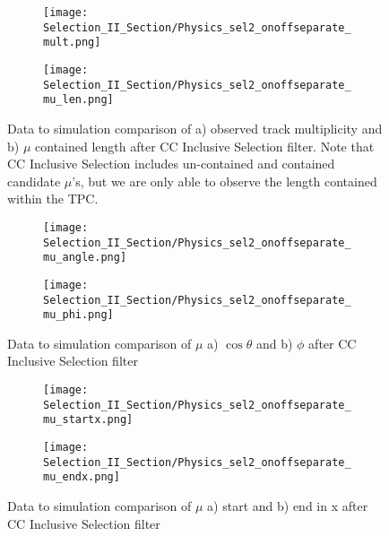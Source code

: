 \begin{figure}[h!]
\centering
  \begin{subfigure}[t]{0.3\textwidth}
    \centering
\texttt{[image: Selection\_II\_Section/Physics\_sel2\_onoffseparate\_mult.png]}
    \caption{ }
  \end{subfigure} 
  \hspace{30 mm}
  \begin{subfigure}[t]{0.3\textwidth}
    \centering
\texttt{[image: Selection\_II\_Section/Physics\_sel2\_onoffseparate\_mu\_len.png]}
    \caption{ }
  \end{subfigure} 
 
\caption{ Data to simulation comparison of a) observed track multiplicity and b) $\mu$ contained length after CC Inclusive Selection filter.  Note that CC Inclusive Selection includes un-contained and contained candidate $\mu$'s, but we are only able to observe the length contained within the TPC.  }
\label{fig:physics_sel2_mulen}
\end{figure}

\begin{figure}[h!]
\centering
  \begin{subfigure}[t]{0.3\textwidth}
    \centering
\texttt{[image: Selection\_II\_Section/Physics\_sel2\_onoffseparate\_mu\_angle.png]}
   \caption{ }
  \end{subfigure} 
  \hspace{30 mm}
  \begin{subfigure}[t]{0.3\textwidth}
    \centering
    \texttt{[image: Selection\_II\_Section/Physics\_sel2\_onoffseparate\_mu\_phi.png]}
  \caption{ }
  \end{subfigure} 
\caption{ Data to simulation comparison of $\mu$ a) $\cos\theta$  and b) $\phi$ after CC Inclusive Selection filter }
\label{fig:physics_sel2_muphi}
\end{figure}

\begin{figure}[t!]
\centering
  \begin{subfigure}[t]{0.3\textwidth}
    \centering
\texttt{[image: Selection\_II\_Section/Physics\_sel2\_onoffseparate\_mu\_startx.png]}
   \caption{ }
  \end{subfigure} 
  \hspace{30 mm}
  \begin{subfigure}[t]{0.3\textwidth}
    \centering
\texttt{[image: Selection\_II\_Section/Physics\_sel2\_onoffseparate\_mu\_endx.png]}
   \caption{ }
  \end{subfigure} 
\caption{ Data to simulation comparison of $\mu$ a) start and b) end in x after CC Inclusive Selection filter }
\label{fig:physics_sel2_x}
\end{figure}

